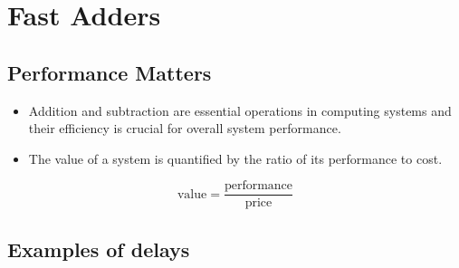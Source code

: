 \documentclass[12pt,openany]{book}
\begin{document}
			      	\section{Fast Adders}
			      	\subsection{Performance Matters}
			      	\begin{itemize}
			      		\item[] Addition and subtraction are essential operations in computing systems and their efficiency is crucial for overall system performance.
			      		\item[] The value of a system is quantified by the ratio of its performance to cost.
			      	\end{itemize}
			      	\[
			      		\text{value} = \frac{\text{performance}}{\text{price}}
			      	\]
			      	\subsection{Examples of delays}
			      	
\end{document}
